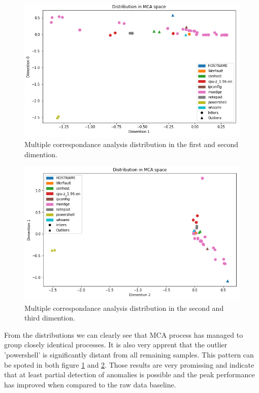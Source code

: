 \documentclass[a4paper,twoside,12pt]{book}
\begin{document}
\begin{figure}
	\centering
	\includegraphics[scale=0.9]{images/MCA01}
	\caption{Multiple correspondance analysis distribution in the first and second dimention.}
	\label{fig:mca01}
 \end{figure}

 \begin{figure}
	\centering
	\includegraphics[scale=0.9]{images/MCA12}
	\caption{Multiple correspondance analysis distribution in the second and third dimention.}
	\label{fig:mca12}
 \end{figure}

From the distributions we can clearly see that MCA process has managed to group closely identical processes.
It is also very apprent that the outlier 'powershell' is significantly distant from all remaining samples. 
This pattern can be spoted in both figure \ref{fig:mca01} and \ref{fig:mca12}. Those results are very 
promissing and indicate that at least partial detection of anomalies is possible and the peak performance
has improved when compared to the raw data baseline. 
\end{document}

